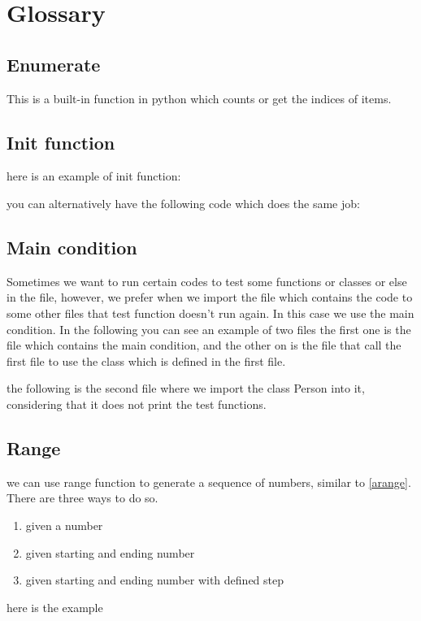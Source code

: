 \documentclass[10pt,a4paper]{article}
\begin{document}




\section{Glossary}


\subsection{Enumerate}
This is a built-in function in python which counts or get the indices  of items.



\subsection{Init function}
\label{subsec:init}
here is an example of init function:

you can alternatively have the following code which does the same job:



\subsection{Main condition} \label{main}
Sometimes we want to run certain codes to test some functions or classes or else in the file, however, we prefer when we import the file which contains the code to some other files that test function doesn't run again. In this case we use the main condition. In the following you can see an example of two files the first one is the file which contains the main condition, and the other on is the file that call the first file to use the class which is defined in the first file.

the following is the second file where we import the class Person into it, considering that it does not print the test functions.



\subsection{Range} \label{range}
we can use range function to generate a sequence of numbers, similar to \ref{arange}. There are three ways to do so.
\begin{enumerate}
\item given a number
\item given starting and ending number
\item given starting and ending number with defined step
\end{enumerate}
here is the example

\end{document}
